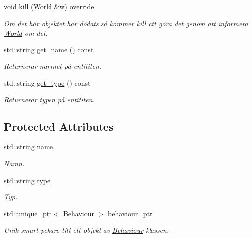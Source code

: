 \begin{DoxyCompactItemize}
\item 
void \hyperlink{classPlatform_a6dd2fe10f6de044db339c5050bdb7ef0}{kill} (\hyperlink{classWorld}{World} \&w) override
\begin{DoxyCompactList}\small\item\em Om det här objektet har dödats så kommer kill att göra det genom att informera \hyperlink{classWorld}{World} om det. \end{DoxyCompactList}\item 
std\+::string \hyperlink{classEntity_a75c7e4aad3df2e053ee5b43169509534}{get\+\_\+name} () const 
\begin{DoxyCompactList}\small\item\em Returnerar namnet på entititen. \end{DoxyCompactList}\item 
std\+::string \hyperlink{classEntity_a0e9ef479c1147e21e5bcb338cb858df2}{get\+\_\+type} () const 
\begin{DoxyCompactList}\small\item\em Returnerar typen på entititen. \end{DoxyCompactList}\end{DoxyCompactItemize}
\subsection*{Protected Attributes}
\begin{DoxyCompactItemize}
\item 
std\+::string \hyperlink{classEntity_a931b21fbdebb1a5963b4bcab5df128f5}{name}
\begin{DoxyCompactList}\small\item\em Namn. \end{DoxyCompactList}\item 
std\+::string \hyperlink{classEntity_a298a9ebf2474bb00874b5ff6a0d637ef}{type}
\begin{DoxyCompactList}\small\item\em Typ. \end{DoxyCompactList}\item 
std\+::unique\+\_\+ptr$<$ \hyperlink{classBehaviour}{Behaviour} $>$ \hyperlink{classEntity_adb6e36848db24e6d48e6d295e19d3972}{behaviour\+\_\+ptr}
\begin{DoxyCompactList}\small\item\em Unik smart-\/pekare till ett objekt av \hyperlink{classBehaviour}{Behaviour} klassen. \end{DoxyCompactList}\end{DoxyCompactItemize}


